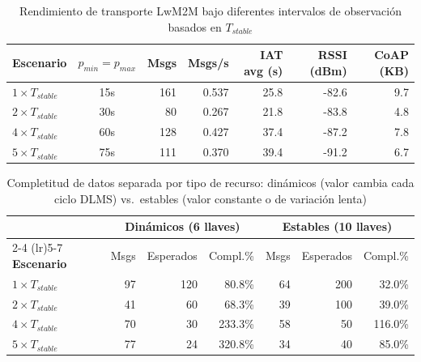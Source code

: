 \begin{table}[htbp]
\centering
\caption{Rendimiento de transporte LwM2M bajo diferentes intervalos de observación basados en $T_{stable}$}
\label{tab:benchmark-v2-aggregate}
\begin{tabular}{lcrrrrr}
\toprule
\textbf{Escenario} & \textbf{$p_{min}=p_{max}$} & \textbf{Msgs} & \textbf{Msgs/s} & \textbf{IAT avg (s)} & \textbf{RSSI (dBm)} & \textbf{CoAP (KB)} \\
\midrule
$1\times T_{stable}$ & 15s & 161 & 0.537 & 25.8 & -82.6 & 9.7 \\
$2\times T_{stable}$ & 30s & 80 & 0.267 & 21.8 & -83.8 & 4.8 \\
$4\times T_{stable}$ & 60s & 128 & 0.427 & 37.4 & -87.2 & 7.8 \\
$5\times T_{stable}$ & 75s & 111 & 0.370 & 39.4 & -91.2 & 6.7 \\
\bottomrule
\end{tabular}
\end{table}

\begin{table}[htbp]
\centering
\caption{Completitud de datos separada por tipo de recurso: dinámicos (valor cambia cada ciclo DLMS) vs.\ estables (valor constante o de variación lenta)}
\label{tab:benchmark-v2-groups}
\begin{tabular}{lrrrrrr}
\toprule
& \multicolumn{3}{c}{\textbf{Dinámicos (6 llaves)}} & \multicolumn{3}{c}{\textbf{Estables (10 llaves)}} \\
\cmidrule(lr){2-4} \cmidrule(lr){5-7}
\textbf{Escenario} & Msgs & Esperados & Compl.\% & Msgs & Esperados & Compl.\% \\
\midrule
$1\times T_{stable}$ & 97 & 120 & 80.8\% & 64 & 200 & 32.0\% \\
$2\times T_{stable}$ & 41 & 60 & 68.3\% & 39 & 100 & 39.0\% \\
$4\times T_{stable}$ & 70 & 30 & 233.3\% & 58 & 50 & 116.0\% \\
$5\times T_{stable}$ & 77 & 24 & 320.8\% & 34 & 40 & 85.0\% \\
\bottomrule
\end{tabular}
\end{table}

